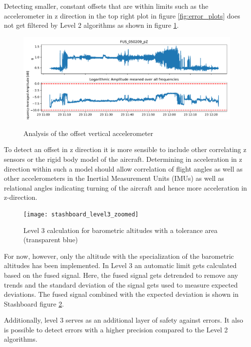 Detecting smaller, constant offsets that are within limits such as the accelerometer in z direction in the top right plot in figure \ref{fig:error_plots} does not get filtered by Level 2 algorithms as shown in figure \ref{fig:results_050209}.
\begin{figure}
    \centering
    \includegraphics[width=\textwidth]{03_figures/python_functions/images/FUS_050209}
    \label{fig:results_050209}
    \caption{Analysis of the offset vertical accelerometer}
\end{figure}

To detect an offset in z direction it is more sensible to include other correlating z sensors or the rigid body model of the aircraft. Determining in acceleration in z direction within such a model should allow correlation of flight angles as well as other accelerometers in the Inertial Measurement Units (IMUs) as well as relational angles indicating turning of the aircraft and hence more acceleration in z-direction.
\begin{figure}
    \centering
    \texttt{[image: stashboard\_level3\_zoomed]}
    \caption{Level 3 calculation for barometric altitudes with a tolerance area (transparent blue)}
    \label{fig:stashboard_level3_zoomed}
\end{figure}

For now, however, only the altitude with the specialization of the barometric altitudes has been implemented. In Level 3 an automatic limit gets calculated based on the fused signal. Here, the fused signal gets detrended to remove any trends and the standard deviation of the signal gets used to measure expected deviations. The fused signal combined with the expected deviation is shown in Stashboard figure \ref{fig:stashboard_level3_zoomed}.

Additionally, level 3 serves as an additional layer of safety against errors. It also is possible to detect errors with a higher precision compared to the Level 2 algorithms.




